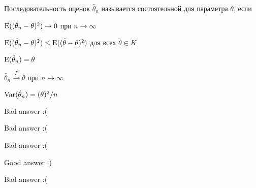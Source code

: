 
\begin{question}
Последовательность оценок \(\hat \theta_n\) называется состоятельной для
параметра \(\theta\), если
\begin{answerlist}
  \item \(\operatorname{E}((\hat \theta_n - \theta)^2) \stackrel{}{\to} 0\) при
\(n\stackrel{}{\to} \infty\)
  \item \(\operatorname{E}((\hat \theta_n - \theta)^2) \leq \operatorname{E}((\tilde \theta - \theta)^2)\)
для всех \(\tilde \theta \in K\)
  \item \(\operatorname{E}(\hat \theta_n)=\theta\)
  \item \(\hat \theta_n \stackrel{P}{\to} \theta\) при
\(n\stackrel{}{\to} \infty\)
  \item \(\operatorname{Var}(\hat \theta_n)=(\theta)^2/n\)
\end{answerlist}
\end{question}

\begin{solution}
\begin{answerlist}
  \item Bad answer :(
  \item Bad answer :(
  \item Bad answer :(
  \item Good answer :)
  \item Bad answer :(
\end{answerlist}
\end{solution}

